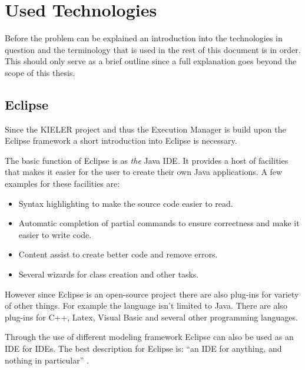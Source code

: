 \chapter{Used Technologies}
\label{chapter:ConfTechnology}
Before the problem can be explained an introduction into the technologies in question
and the terminology that is used in the rest of this document is in order. This should
only serve as a brief outline since a full explanation goes beyond the scope of this
thesis.

\section{Eclipse}
\label{section:ConfTechEclipse}
Since the \ac{KIELER} project and thus the Execution Manager is build upon the 
Eclipse framework a short introduction into Eclipse is necessary.

The basic function of Eclipse is as \textit{the} Java \ac{IDE}. It provides
a host of facilities that makes it easier for the user to create their own Java applications.
A few examples for these facilities are:
\begin{itemize}
 \item Syntax highlighting to make the source code easier to read.
 \item Automatic completion of partial commands to ensure correctness
and make it easier to write code.
 \item Content assist to create better code and remove errors.
 \item Several wizards for class creation and other tasks.
\end{itemize}

However since Eclipse is an open-source project there are also plug-ins for variety of
other things. For example the language isn't limited to Java. There are also plug-ins
for C++, Latex, Visual Basic and several other programming languages.

Through the use of different modeling framework Eclipse can also be used as an \ac{IDE}
for \ac{IDE}s. The best description for Eclipse is: ``an IDE for anything, and nothing in particular'' \cite{eclipseOverview}.

